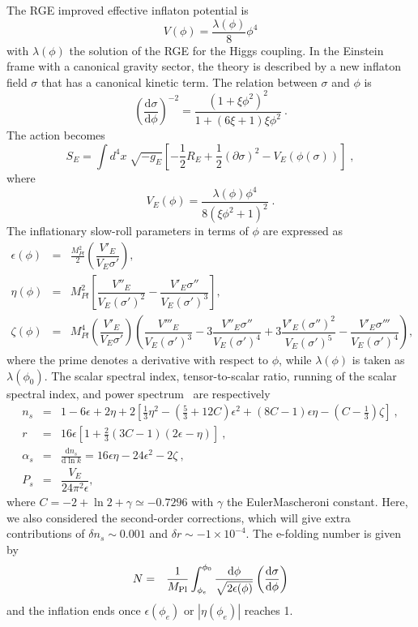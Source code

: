 \documentclass[aps,prd,preprint,superscriptaddress,showpacs,ctexart]{revtex4-1}
\newcommand{\dd}{\mathrm{d}}
\begin{document}
The RGE improved effective inflaton potential is
\begin{equation}
V(\phi)=\frac{\lambda(\phi)}{8}\phi^{4}
\end{equation}
with $\lambda(\phi)$ the solution of the RGE for the Higgs coupling.
In the Einstein frame with a canonical gravity sector, the theory
is described by a new inflaton field $\sigma$ that has a canonical
kinetic term. The relation between $\sigma$ and $\phi$ is
\begin{equation}
\left(\frac{\dd\sigma}{\dd\phi}\right)^{-2}=\dfrac{(1+\xi\phi^{2})^{2}}{1+(6\xi+1)\xi\phi^{2}}~.
\end{equation}
The action becomes
\begin{equation}
S_{E}=\int d^{4}x\;\sqrt{-g_{E}}\left[-\frac{1}{2}R_{E}+\frac{1}{2}(\partial\sigma)^{2}-V_{E}(\phi(\sigma))\right]\;,
\end{equation}
where
\begin{equation}
V_{E}(\phi)=\frac{\lambda(\phi)\phi^{4}}{8\left(\xi\phi^{2}+1\right)^{2}}\;.
\end{equation}
The inflationary slow-roll parameters in terms of $\phi$ are expressed
as
\begin{eqnarray}
\epsilon(\phi) & = & \frac{M_{Pl}^{2}}{2}\left(\dfrac{V'_{E}}{V_{E}\sigma'}\right),\\
\eta(\phi) & = & M_{Pl}^{2}\left[\dfrac{V''_{E}}{V_{E}(\sigma')^{2}}-\dfrac{V'_{E}\sigma''}{V_{E}(\sigma')^{3}}\right],\\
\zeta(\phi) & = & M_{Pl}^{4}\left(\dfrac{V'_{E}}{V_{E}\sigma'}\right)\left(\dfrac{V'''_{E}}{V_{E}(\sigma')^{3}}-3\dfrac{V''_{E}\sigma''}{V_{E}(\sigma')^{4}}+3\dfrac{V'_{E}(\sigma'')^{2}}{V_{E}(\sigma')^{5}}-\dfrac{V'_{E}\sigma'''}{V_{E}(\sigma')^{4}}\right),
\end{eqnarray}
where the prime denotes a derivative with respect to $\phi$, while
$\lambda(\phi)$ is taken as $\lambda(\phi_{0})$. The scalar spectral
index, tensor-to-scalar ratio, running of the scalar spectral index,
and power spectrum~\cite{Lyth:1998xn-1} are respectively
\begin{eqnarray}
n_{s} & = & 1-6\epsilon+2\eta+2\left[\frac{1}{3}\eta^{2}-\left(\frac{5}{3}+12C\right)\epsilon^{2}+(8C-1)\epsilon\eta-(C-\frac{1}{3})\zeta\right]~,\\
r & = & 16\epsilon\left[1+\frac{2}{3}(3C-1)(2\epsilon-\eta)\right]~,\\
\alpha_{s} & = & \frac{\dd n_{s}}{\dd\ln k}=16\epsilon\eta-24\epsilon^{2}-2\zeta~,~\\
P_{s} & = & \dfrac{V_{E}}{24\pi^{2}\epsilon},
\end{eqnarray}
where $C=-2+\ln2+\gamma\simeq-0.7296$ with $\gamma$ the Euler\textendash Mascheroni
constant. Here, we also considered the second-order corrections, which
will give extra contributions of $\delta n_{s}\sim0.001$ and $\delta r\sim-1\times10^{-4}$.
The e-folding number is given by
\begin{eqnarray}
N & = & \frac{1}{M_{{\rm Pl}}}\int_{\phi_{e}}^{\phi_{0}}\dfrac{\dd\phi}{\sqrt{2\epsilon(\phi)}}\left(\dfrac{\dd\sigma}{\dd\phi}\right)
\end{eqnarray}
and the inflation ends once $\epsilon(\phi_{e})$ or $|\eta(\phi_{e})|$ reaches 1.
\end{document}
